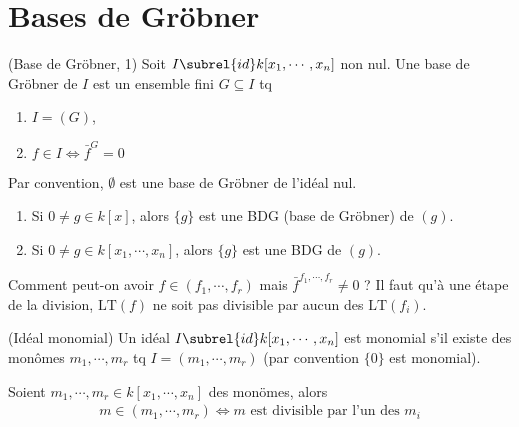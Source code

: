     \section{Bases de Gröbner}
        \begin{defi} (Base de Gröbner, 1)
            \label{grob_1}
            Soit $I \subrel{id} k[x_1, \cdots, x_n]$ non nul. Une base de Gröbner de $I$ est un ensemble fini $G \subseteq I$ tq
            \begin{enumerate}
                \item $I = (G)$,
                \item $f \in I \iff \bar f^G = 0$
            \end{enumerate}
        \end{defi}
        Par convention, $\emptyset$ est une base de Gröbner de l'idéal nul.
        \begin{expl}
            \begin{enumerate}
                \item Si $0 \neq g \in k[x]$, alors $\{g\}$ est une BDG (base de Gröbner) de $(g)$.
                \item Si $0 \neq g \in k[x_1, \cdots, x_n]$, alors $\{g\}$ est une BDG de $(g)$.
            \end{enumerate}
        \end{expl}
        Comment peut-on avoir $f \in (f_1, \cdots, f_r)$ mais $\bar f^{f_1, \cdots, f_r} \neq 0$ ? Il faut qu'à une étape de la division, $\mathrm{LT}(f)$ ne soit pas divisible par aucun des $\mathrm{LT}(f_i)$. 
        \begin{defi} (Idéal monomial)
            Un idéal $I \subrel{id} k[x_1, \cdots, x_n]$ est monomial s'il existe des monômes $m_1, \cdots, m_r$ tq $I = (m_1, \cdots, m_r)$ (par convention $\{0\}$ est monomial).
        \end{defi}
        \begin{prop}
            \label{lemme_nul}
            Soient $m_1, \cdots, m_r \in k[x_1, \cdots, x_n]$ des monömes, alors 
            \begin{align*}
                m \in (m_1, \cdots, m_r) \iff m \text{ est divisible par l'un des } m_i
            \end{align*}
        \end{prop}
